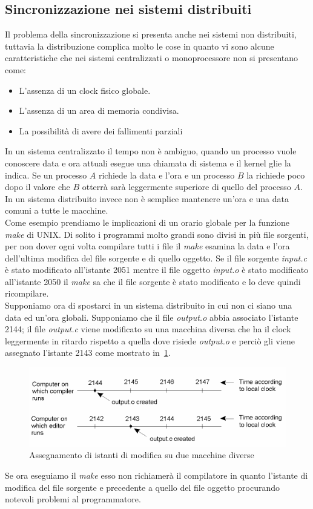 \subsection{Sincronizzazione nei sistemi distribuiti}
Il problema della sincronizzazione si presenta anche nei sistemi non distribuiti, tuttavia la distribuzione complica molto le cose in quanto vi sono alcune caratteristiche che nei sistemi centralizzati o monoprocessore non si presentano come:
\begin{itemize}
\item L'assenza di un clock fisico globale.
\item L'assenza di un area di memoria condivisa.
\item La possibilità di avere dei fallimenti parziali
\end{itemize}
In un sistema centralizzato il tempo non è ambiguo, quando un processo vuole conoscere data e ora attuali esegue una chiamata di sistema e il kernel glie la indica. Se un processo $A$ richiede la data e l'ora e un processo $B$ la richiede poco dopo il valore che $B$ otterrà sarà leggermente superiore di quello del processo $A$. In un sistema distribuito invece non è semplice mantenere un'ora e una data comuni a tutte le macchine.\\
Come esempio prendiamo le implicazioni di un orario globale per la funzione \emph{make} di UNIX. Di solito i programmi molto grandi sono divisi in più file sorgenti, per non dover ogni volta compilare tutti i file il \emph{make} esamina la data e l'ora dell'ultima modifica del file sorgente e di quello oggetto. Se il file sorgente \emph{input.c} è stato modificato all'istante 2051 mentre il file oggetto \emph{input.o} è stato modificato all'istante 2050 il \emph{make} sa che il file sorgente è stato modificato e lo deve quindi ricompilare.\\
Supponiamo ora di spostarci in un sistema distribuito in cui non ci siano una data ed un'ora globali. Supponiamo che il file \emph{output.o} abbia associato l'istante 2144; il file \emph{output.c} viene modificato su una macchina diversa che ha il clock leggermente in ritardo rispetto a quella dove risiede \emph{output.o} e perciò gli viene assegnato l'istante 2143 come mostrato in \figurename\,\ref{fig:maketime}.
\begin{figure}
\centering
\includegraphics[scale=0.5]{img/maketime.png}
\caption{Assegnamento di istanti di modifica su due macchine diverse}\label{fig:maketime}
\end{figure}
Se ora eseguiamo il \emph{make} esso non richiamerà il compilatore in quanto l'istante di modifica del file sorgente e precedente a quello del file oggetto procurando notevoli problemi al programmatore.
